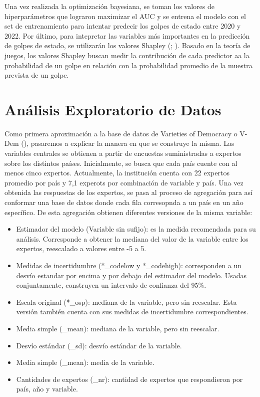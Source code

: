 \documentclass{article}
\begin{document}
Una vez realizada la optimización bayesiana, se toman los valores de hiperparámetros
que lograron maximizar el AUC y se entrena el modelo con el set de entrenamiento 
para intentar predecir los golpes de estado entre 2020 y 2022. Por último, para 
intepretar las variables más importantes en la predicción de golpes de estado, se 
utilizarán los valores Shapley (\cite{Str10}; \cite{Lun17}). Basado en la teoría de 
juegos, los valores Shapley buscan medir la contribución de cada predictor aa la 
probabilidad de un golpe en relación con la probabilidad promedio de la muestra 
prevista de un golpe.

\section{Análisis Exploratorio de Datos}

Como primera aproximación a la base de datos de Varieties of Democracy o V-Dem 
(\cite{CopMet24}), pasaremos a explicar la manera en que se construye la misma. Las
variables centrales se obtienen a partir de encuestas suministradas a expertos
sobre los distintos países. Inicialmente, se busca que cada país cuente con al menos
cinco expertos. Actualmente, la institución cuenta con 22 expertos promedio por país
y 7,1 experots por combinación de variable y país. Una vez obtenida las respuestas
de los expertos, se pasa al proceso de agregación para así conformar una base de 
datos donde cada fila corresopnda a un país en un año específico. De esta agregación
obtienen diferentes versiones de la misma variable:

\begin{itemize}
  \item Estimador del modelo (Variable sin sufijo): es la medida
   recomendada para su análisis. Corresponde a obtener la mediana del valor de 
   la variable entre los expertos, reescalado a valores entre -5 a 5.
  \item Medidas de incertidumbre (*\_codelow y *\_codehigh): corresponden a un 
  desvío estandar por encima y por debajo del estimador del modelo. 
  Usadas conjuntamente, construyen un intervalo de confianza del 95\%.
  \item Escala original (*\_osp): mediana de la variable, pero sin reescalar. Esta
  versión también cuenta con sus medidas de incertidumbre correspondientes.
  \item Media simple (\_mean): mediana de la variable, pero sin reescalar.
  \item Desvío estándar (\_sd): desvío estándar de la variable.
  \item Media simple (\_mean): media de la variable.
  \item Cantidades de expertos (\_nr): cantidad de expertos que respondieron por
  país, año y variable.
\end{itemize}
\end{document}
